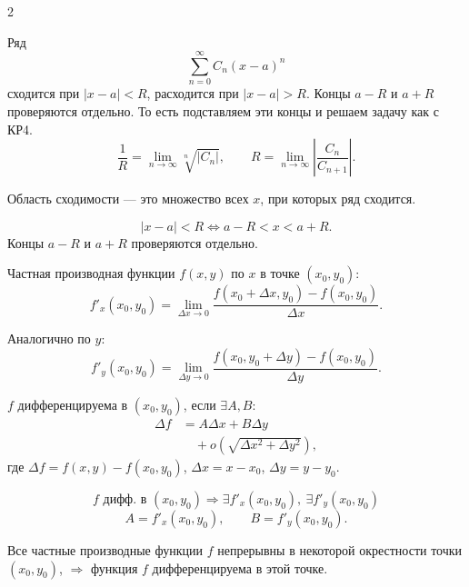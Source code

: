 \begin{multicols}{2}
\begin{theorem}
    Ряд
    \[
        \sum_{n=0}^{\infty} C_n(x-a)^n
    \]
    сходится при $|x-a|<R$, расходится при $|x-a|>R$.
    Концы $a-R$ и $a+R$ проверяются отдельно. То есть подставляем эти концы и решаем задачу как с КР4.
    \[
        \frac{1}{R}=\lim_{n\to\infty}\sqrt[n]{|C_n|},
        \qquad
        R=\lim_{n\to\infty}\left|\frac{C_n}{C_{n+1}}\right|.
    \]
\end{theorem}

\begin{lemma}
        Область сходимости --- это множество всех $x$, при которых ряд сходится.

    \[
        |x-a|<R
        \Longleftrightarrow
        a-R<x<a+R.
    \]
    Концы $a-R$ и $a+R$ проверяются отдельно.
\end{lemma}

\begin{definition}
    Частная производная функции $f(x,y)$ по $x$ в точке $(x_0, y_0)$:
    \[
        f'_x(x_0,y_0)
        =
        \lim_{\Delta x \to 0}
        \frac{
            f(x_0 + \Delta x, y_0) - f(x_0, y_0)
        }{\Delta x}.
    \]
    
    Аналогично по $y$:
    \[
        f'_y(x_0,y_0)
        =
        \lim_{\Delta y \to 0}
        \frac{
            f(x_0, y_0 + \Delta y) - f(x_0, y_0)
        }{\Delta y}.
    \]
\end{definition}

\begin{definition}
    $f$ дифференцируема в $(x_0,y_0)$, если $\exists A,B$:
    \[
        \begin{aligned}
            \Delta f
            &=
            A\Delta x+B\Delta y \\
            &\quad+
            o\left(\sqrt{\Delta x^2+\Delta y^2}\right),
        \end{aligned}
    \]
    где $\Delta f=f(x,y)-f(x_0,y_0)$, $\Delta x=x-x_0$, $\Delta y=y-y_0$.
\end{definition}

\begin{remark}
    \[
        f \text{ дифф. в } (x_0,y_0)
        \Rightarrow
        \exists f'_x(x_0,y_0),\ \exists f'_y(x_0,y_0)
    \]
    \[
        A = f'_x(x_0,y_0),
        \qquad
        B = f'_y(x_0,y_0).
    \]
\end{remark}

\begin{theorem}
    Все частные производные функции $f$ непрерывны в некоторой окрестности точки $(x_0,y_0)$, $\Rightarrow$ функция $f$ дифференцируема в этой точке.
\end{theorem}


\end{multicols}
